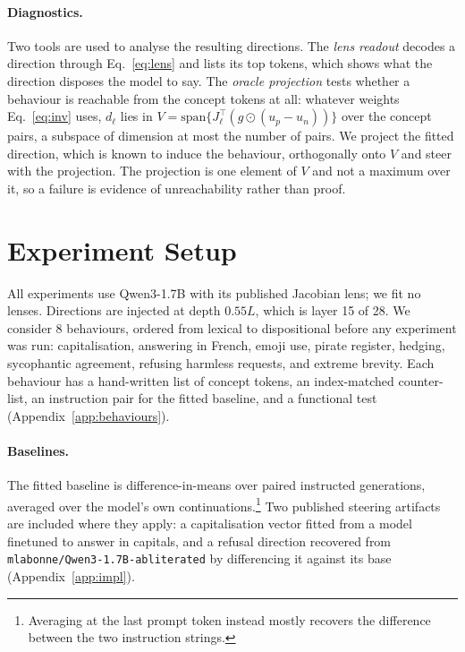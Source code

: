 \documentclass{article}
\begin{document}
\paragraph{Diagnostics.}
Two tools are used to analyse the resulting directions. The \emph{lens readout} decodes a direction through Eq.~\ref{eq:lens} and lists its top tokens, which shows what the direction disposes the model to say. The \emph{oracle projection} tests whether a behaviour is reachable from the concept tokens at all: whatever weights Eq.~\ref{eq:inv} uses, $d_\ell$ lies in $V = \mathrm{span}\{J_\ell^\top (g \odot (u_p - u_n))\}$ over the concept pairs, a subspace of dimension at most the number of pairs. We project the fitted direction, which is known to induce the behaviour, orthogonally onto $V$ and steer with the projection. The projection is one element of $V$ and not a maximum over it, so a failure is evidence of unreachability rather than proof.

\section{Experiment Setup}

All experiments use Qwen3-1.7B with its published Jacobian lens; we fit no lenses. Directions are injected at depth $0.55L$, which is layer 15 of 28. We consider 8 behaviours, ordered from lexical to dispositional before any experiment was run: capitalisation, answering in French, emoji use, pirate register, hedging, sycophantic agreement, refusing harmless requests, and extreme brevity. Each behaviour has a hand-written list of concept tokens, an index-matched counter-list, an instruction pair for the fitted baseline, and a functional test (Appendix~\ref{app:behaviours}).

\paragraph{Baselines.}
The fitted baseline is difference-in-means over paired instructed generations, averaged over the model's own continuations.\footnote{Averaging at the last prompt token instead mostly recovers the difference between the two instruction strings.} Two published steering artifacts are included where they apply: a capitalisation vector fitted from a model finetuned to answer in capitals, and a refusal direction recovered from \texttt{mlabonne/Qwen3-1.7B-abliterated} by differencing it against its base (Appendix~\ref{app:impl}).
\end{document}
